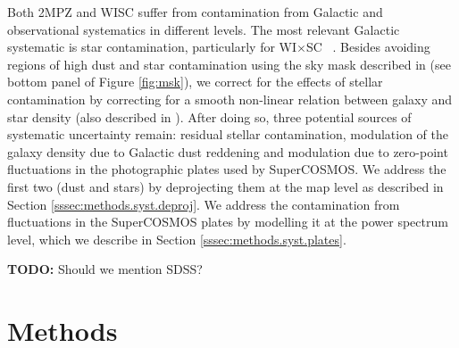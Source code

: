 \documentclass[useAMS,usenatbib]{mn2e}
\newcommand{\wisc}{WI$\times$SC}
\newcommand{\todo}[1]{{\bf TODO:} #1}
\begin{document}
    Both 2MPZ and WISC suffer from contamination from Galactic and observational systematics in different levels. The most relevant Galactic systematic is star contamination, particularly for \wisc~ \citep{2018arXiv181208182X}. Besides avoiding regions of high dust and star contamination using the sky mask described in \cite{2018MNRAS.481.1133P} (see bottom panel of Figure \ref{fig:msk}), we correct for the effects of stellar contamination by correcting for a smooth non-linear relation between galaxy and star density (also described in \cite{2018MNRAS.481.1133P}). After doing so, three potential sources of systematic uncertainty remain: residual stellar contamination, modulation of the galaxy density due to Galactic dust reddening and modulation due to zero-point fluctuations in the photographic plates used by SuperCOSMOS. We address the first two (dust and stars) by deprojecting them at the map level as described in Section \ref{sssec:methods.syst.deproj}. We address the contamination from fluctuations in the SuperCOSMOS plates by modelling it at the power spectrum level, which we describe in Section \ref{sssec:methods.syst.plates}.
    
    \todo{Should we mention SDSS?}

\section{Methods}\label{sec:methods}
\end{document}
